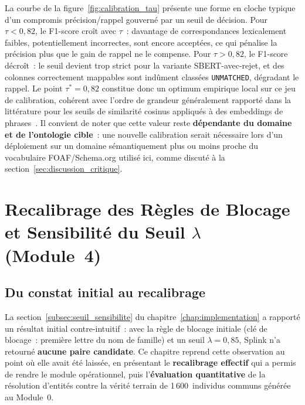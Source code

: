 La courbe de la figure~\ref{fig:calibration_tau} présente une forme en
cloche typique d'un compromis précision/rappel gouverné par un seuil de
décision. Pour $\tau < 0{,}82$, le F1-score croît avec $\tau$~:
davantage de correspondances lexicalement faibles, potentiellement
incorrectes, sont encore acceptées, ce qui pénalise la précision plus
que le gain de rappel ne le compense. Pour $\tau > 0{,}82$, le F1-score
décroît~: le seuil devient trop strict pour la variante
SBERT-avec-rejet, et des colonnes correctement mappables sont
indûment classées \texttt{UNMATCHED}, dégradant le rappel. Le point
$\tau^{*} = 0{,}82$ constitue donc un optimum empirique local sur ce
jeu de calibration, cohérent avec l'ordre de grandeur généralement
rapporté dans la littérature pour les seuils de similarité cosinus
appliqués à des embeddings de phrases~\cite{reimers2019sbert}. Il
convient de noter que cette valeur reste \textbf{dépendante du domaine
et de l'ontologie cible}~: une nouvelle calibration serait nécessaire
lors d'un déploiement sur un domaine sémantiquement plus ou moins
proche du vocabulaire FOAF/Schema.org utilisé ici, comme discuté à la
section~\ref{sec:discussion_critique}.

\section{Recalibrage des Règles de Blocage et Sensibilité du Seuil
         $\lambda$ (Module~4)}
\label{sec:sensibilite_lambda}

\subsection{Du constat initial au recalibrage}

La section~\ref{subsec:seuil_sensibilite} du chapitre~\ref{chap:implementation}
a rapporté un résultat initial contre-intuitif~: avec la règle de
blocage initiale (clé de blocage~: première lettre du nom de famille) et
un seuil $\lambda = 0{,}85$, Splink n'a retourné \textbf{aucune paire
candidate}. Ce chapitre reprend cette observation au point où elle avait
été laissée, en présentant le \textbf{recalibrage effectif} qui a permis
de rendre le module opérationnel, puis l'\textbf{évaluation quantitative}
de la résolution d'entités contre la vérité terrain de 1\,600~individus
communs générée au Module~0.

